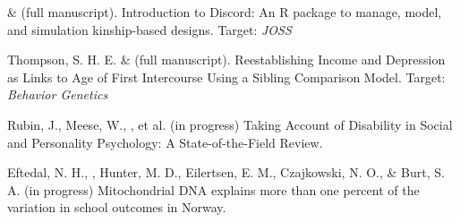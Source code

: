 \begin{etaremune}
\item \jt \& \meb (full manuscript). Introduction to Discord: An R package to manage, model, and simulation kinship-based designs. Target: \textit{JOSS}


\item Thompson, S. H. E. \noteA \& \meb (full manuscript). Reestablishing Income and Depression as Links to Age of First Intercourse Using a Sibling Comparison Model. Target: \textit{Behavior Genetics}

\item Rubin, J., Meese, W., \meb, et al. (in progress) Taking Account of Disability in Social and Personality Psychology: A State-of-the-Field Review.

\item Eftedal, N. H., \meb, Hunter, M. D., Eilertsen, E. M., Czajkowski, N. O., \& Burt, S. A. (in progress) Mitochondrial DNA explains more than one percent of the variation in school outcomes in Norway. 




%
%








\end{etaremune}

